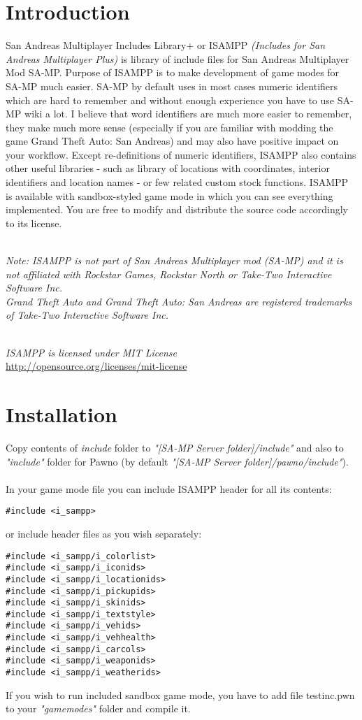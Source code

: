 \documentclass{article}
\begin{document}
\newpage
\section{Introduction}
San Andreas Multiplayer Includes Library+ or ISAMPP \textit{(Includes for San Andreas Multiplayer Plus)} is library of include files for San Andreas Multiplayer Mod SA-MP. Purpose of ISAMPP is to make development of game modes for SA-MP much easier. SA-MP by default uses in most cases numeric identifiers which are hard to remember and without enough experience you have to use SA-MP wiki a lot. I believe that word identifiers are much more easier to remember, they make much more sense (especially if you are familiar with modding the game Grand Theft Auto: San Andreas) and may also have positive impact on your workflow. Except re-definitions of numeric identifiers, ISAMPP also contains other useful libraries - such as library of locations with coordinates, interior identifiers and location names - or few related custom stock functions. ISAMPP is available with sandbox-styled game mode in which you can see everything implemented. You are free to modify and distribute the source code accordingly to its license.

\textit{\\Note: ISAMPP is not part of San Andreas Multiplayer mod (SA-MP) and it is not affiliated with Rockstar Games, Rockstar North or Take-Two Interactive Software Inc.}
\textit{\\Grand Theft Auto and Grand Theft Auto: San Andreas are registered trademarks of Take-Two Interactive Software Inc.}

\textit{\\ISAMPP is licensed under MIT License} \\\url{http://opensource.org/licenses/mit-license}

\section{Installation}
Copy contents of \textit{include} folder to \textit{"[SA-MP Server folder]/include"} and also to \textit{"include"} folder for Pawno (by default \textit{"[SA-MP Server folder]/pawno/include"}).
\\
\\
In your game mode file you can include ISAMPP header for all its contents:
\begin{verbatim}
#include <i_sampp>
\end{verbatim}
or include header files as you wish separately:
\begin{verbatim}
#include <i_sampp/i_colorlist>
#include <i_sampp/i_iconids>
#include <i_sampp/i_locationids>
#include <i_sampp/i_pickupids>
#include <i_sampp/i_skinids>
#include <i_sampp/i_textstyle>
#include <i_sampp/i_vehids>
#include <i_sampp/i_vehhealth>
#include <i_sampp/i_carcols>
#include <i_sampp/i_weaponids>
#include <i_sampp/i_weatherids>
\end{verbatim}
If you wish to run included sandbox game mode, you have to add file testinc.pwn to your \textit{"gamemodes"} folder and compile it.
\end{document}
